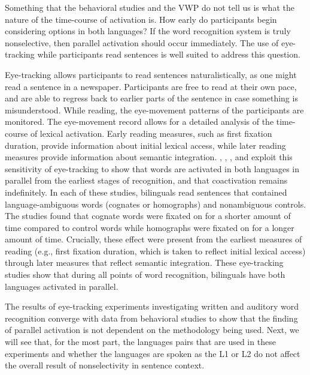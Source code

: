 Something that the behavioral studies and the VWP do not tell us is what the nature of the time-course of activation is. How early do participants begin considering options in both languages? If the word recognition system is truly nonselective, then parallel activation should occur immediately.  The use of eye-tracking while participants read sentences is well suited to address this question. 

Eye-tracking allows participants to read sentences naturalistically, as one might read a sentence in a newspaper. Participants are free to read at their own pace, and are able to regress back to earlier parts of the sentence in case something is misunderstood. While reading, the eye-movement patterns of the participants are monitored. The eye-movement record allows for a detailed analysis of the time-course of lexical activation. Early reading measures, such as first fixation duration, provide information about initial lexical access, while later reading measures provide information about semantic integration. 
\textcite{Duyck2007}, \textcite{Libben2009}, \textcite{VanAssche2009}, and \textcite{VanAssche2010} exploit this sensitivity of eye-tracking to show that words are activated in both languages in parallel from the earliest stages of recognition, and that coactivation remains indefinitely. In each of these studies, bilinguals read sentences that contained language-ambiguous words (cognates or homographs) and nonambiguous controls. The studies found that cognate words were fixated on for a shorter amount of time compared to control words while homographs were fixated on for a longer amount of time. Crucially, these effect were present from the earliest measures of reading (e.g., first fixation duration, which is taken to reflect initial lexical access) through later measures that reflect semantic integration. These eye-tracking studies show that during all points of word recognition, bilinguals have both languages activated in parallel.

The results of eye-tracking experiments investigating written and auditory word recognition converge with data from  behavioral studies to show that the finding of parallel activation is not dependent on the methodology being used. Next, we will see that, for the most part, the languages pairs that are used in these experiments and whether the languages are spoken as the L1 or L2 do not affect the overall result of nonselectivity in sentence context. 

